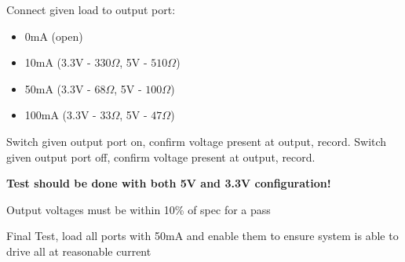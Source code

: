 Connect given load to output port:
\begin{itemize}
\item 0mA (open)
\item 10mA (3.3V - $330\Omega$, 5V - $510\Omega$)
\item 50mA (3.3V - $68\Omega$, 5V - $100\Omega$)
\item 100mA (3.3V - $33\Omega$, 5V - $47\Omega$)
\end{itemize}

Switch given output port on, confirm voltage present at output, record. Switch given output port off, confirm voltage present at output, record. 

\textbf{Test should be done with both 5V and 3.3V configuration!} 

Output voltages must be within 10\% of spec for a pass 

Final Test, load all ports with 50mA and enable them to ensure system is able to drive all at reasonable current\\[5pt]



